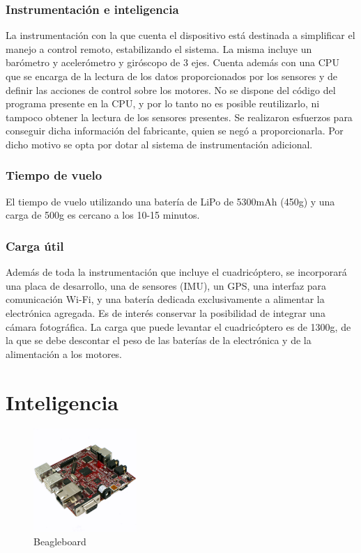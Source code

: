 \documentclass[main]{subfiles}
\begin{document}
\subsubsection*{Instrumentaci\'on e inteligencia}

	La instrumentaci\'on con la que cuenta el dispositivo est\'a destinada a simplificar el manejo a control remoto, estabilizando el sistema. La misma incluye un bar\'ometro y aceler\'ometro y gir\'oscopo de 3 ejes. Cuenta adem\'as con una CPU que se encarga de la lectura de los datos proporcionados por los sensores y de definir las acciones de control sobre los motores. No se dispone del c\'odigo del programa presente en la CPU, y por lo tanto no es posible reutilizarlo, ni tampoco obtener la lectura de los sensores presentes. Se realizaron esfuerzos para conseguir dicha informaci\'on del fabricante, quien se neg\'o a proporcionarla. Por dicho motivo se opta por dotar al sistema de instrumentaci\'on adicional. 

\subsubsection*{Tiempo de vuelo}

El tiempo de vuelo utilizando una bater\'ia de LiPo de 5300mAh (450g) y una carga de 500g es cercano a los 10-15 minutos.

\subsubsection*{Carga \'util}

Adem\'as de toda la instrumentaci\'on que incluye el cuadric\'optero, se incorporar\'a una placa de desarrollo, una de sensores (IMU), un GPS, una interfaz para comunicaci\'on Wi-Fi, y una bater\'ia dedicada exclusivamente a alimentar la electr\'onica agregada. Es de inter\'es conservar la posibilidad de integrar una c\'amara fotogr\'afica. La carga que puede levantar el cuadric\'optero es de 1300g, de la que se debe descontar el peso de las bater\'ias de la electr\'onica y de la alimentaci\'on a los motores.


\section{Inteligencia}
\begin{figure}
\vspace{-30pt}
	\centering
	\includegraphics[width=0.35\textwidth]{./pics_eleccion_hardware/beagle.pdf}
\vspace{-30pt}
	\caption{Beagleboard}
	\label{fig:beagleboard}
\end{figure}
\end{document}
